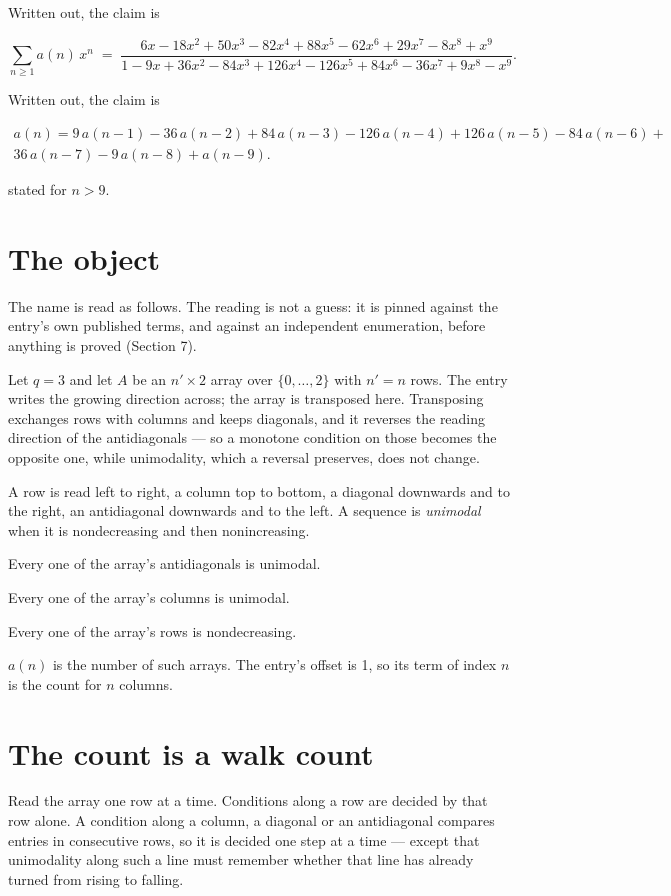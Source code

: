 \documentclass[11pt]{article}
\theoremstyle{definition}
\begin{document}
Written out, the claim is

\[\sum_{n \ge 1} a(n)\,x^n \;=\; \frac{6x - 18x^{2} + 50x^{3} - 82x^{4} + 88x^{5} - 62x^{6} + 29x^{7} - 8x^{8} + x^{9}}{1 - 9x + 36x^{2} - 84x^{3} + 126x^{4} - 126x^{5} + 84x^{6} - 36x^{7} + 9x^{8} - x^{9}}.\]

Written out, the claim is

\begin{multline*} a(n) = 9\,a(n-1) - 36\,a(n-2) + 84\,a(n-3) - 126\,a(n-4) + 126\,a(n-5) - 84\,a(n-6) + \\ 36\,a(n-7) - 9\,a(n-8) + a(n-9). \end{multline*}

stated for $n > 9$.

\section{The object}

The name is read as follows. The reading is not a guess: it is pinned against the entry's own published terms, and against an independent enumeration, before anything is proved (Section 7).

Let $q = 3$ and let $A$ be an $n' \times 2$ array over $\{0,\dots,2\}$ with $n' = n$ rows. The entry writes the growing direction across; the array is transposed here. Transposing exchanges rows with columns and keeps diagonals, and it reverses the reading direction of the antidiagonals --- so a monotone condition on those becomes the opposite one, while unimodality, which a reversal preserves, does not change.

A row is read left to right, a column top to bottom, a diagonal downwards and to the right, an antidiagonal downwards and to the left. A sequence is {\itshape unimodal} when it is nondecreasing and then nonincreasing.

Every one of the array's antidiagonals is unimodal.

Every one of the array's columns is unimodal.

Every one of the array's rows is nondecreasing.

$a(n)$ is the number of such arrays. The entry's offset is 1, so its term of index $n$ is the count for $n$ columns.

\section{The count is a walk count}

Read the array one row at a time. Conditions along a row are decided by that row alone. A condition along a column, a diagonal or an antidiagonal compares entries in consecutive rows, so it is decided one step at a time --- except that unimodality along such a line must remember whether that line has already turned from rising to falling.
\end{document}
